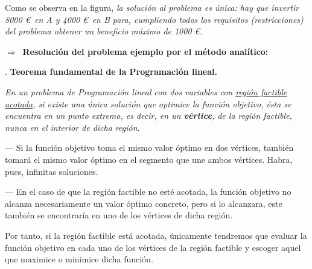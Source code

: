 \vspace{5mm} %

\begin{destacado}	
Como se observa en la figura, \emph{la solución al problema es única:	hay que invertir 8000 \euro $\,$  en A y 4000 \euro $\,$ en B para, cumpliendo todos los requisitos (restricciones) del problema obtener un beneficio máximo de 1000 \euro.}
\end{destacado}	

\vspace{1cm}%
$\Longrightarrow \ $ \textbf{Resolución del problema ejemplo por el método analítico:}


\vspace{5mm}
\begin{theorem}
.	\textbf{Teorema fundamental de la Programación lineal.}

\emph{En un problema de Programación lineal con dos variables con \underline{región factible acotada}, si existe una única solución que optimice la función objetivo, ésta se encuentra en un punto extremo, es decir, en un \textbf{vértice}, de la región factible, nunca en el interior de dicha región}.

--- Si la función objetivo toma el mismo valor óptimo en dos vértices, también tomará el mismo valor óptimo en el segmento que une ambos vértices. Habra, pues, infinitas soluciones.

--- En el caso de que la región factible no esté acotada, la función objetivo no alcanza necesariamente un valor óptimo concreto, pero si lo alcanzara, este también se encontraría en uno de los vértices de dicha región.
\end{theorem}

\vspace{5mm} Por tanto, si la región factible está acotada, únicamente tendremos que evaluar la función objetivo en cada uno de los vértices de la región factible y escoger aquel que maximice o minimice dicha función.

\vspace{5mm} %


